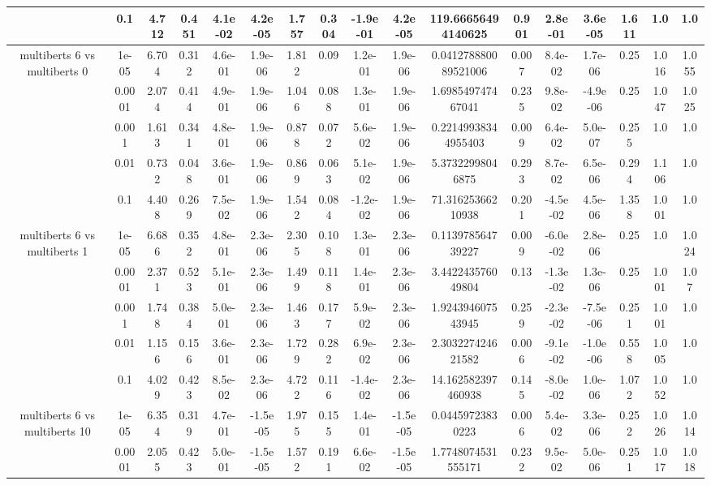 \begin{tabular}{|c|c|c|c|c|c|c|c|c|c|c|c|c|c|c|c|c|}
 & 0.1 & 4.712 & 0.451 & 4.1e-02 & 4.2e-05 & 1.757 & 0.304 & -1.9e-01 & 4.2e-05 & 119.66656494140625 & 0.901 & 2.8e-01 & 3.6e-05 & 1.611 & 1.0 & 1.0 \\
\hline
\multirow{5}{*}{multiberts 6 vs multiberts 0} & 1e-05 & 6.704 & 0.312 & 4.6e-01 & 1.9e-06 & 1.812 & 0.09 & 1.2e-01 & 1.9e-06 & 0.041278880089521006 & 0.007 & 8.4e-02 & 1.7e-06 & 0.25 & 1.016 & 1.055 \\
 & 0.0001 & 2.074 & 0.414 & 4.9e-01 & 1.9e-06 & 1.046 & 0.088 & 1.3e-01 & 1.9e-06 & 1.698549747467041 & 0.235 & 9.8e-02 & -4.9e-06 & 0.25 & 1.047 & 1.025 \\
 & 0.001 & 1.613 & 0.341 & 4.8e-01 & 1.9e-06 & 0.878 & 0.072 & 5.6e-02 & 1.9e-06 & 0.22149938344955403 & 0.009 & 6.4e-02 & 5.0e-07 & 0.255 & 1.0 & 1.0 \\
 & 0.01 & 0.732 & 0.048 & 3.6e-01 & 1.9e-06 & 0.869 & 0.063 & 5.1e-02 & 1.9e-06 & 5.37322998046875 & 0.293 & 8.7e-02 & 6.5e-06 & 0.294 & 1.106 & 1.0 \\
 & 0.1 & 4.408 & 0.269 & 7.5e-02 & 1.9e-06 & 1.542 & 0.084 & -1.2e-02 & 1.9e-06 & 71.31625366210938 & 0.201 & -4.5e-02 & 4.5e-06 & 1.358 & 1.001 & 1.0 \\
\hline
\multirow{5}{*}{multiberts 6 vs multiberts 1} & 1e-05 & 6.686 & 0.352 & 4.8e-01 & 2.3e-06 & 2.305 & 0.108 & 1.3e-01 & 2.3e-06 & 0.113978564739227 & 0.009 & -6.0e-02 & 2.8e-06 & 0.25 & 1.0 & 1.024 \\
 & 0.0001 & 2.371 & 0.523 & 5.1e-01 & 2.3e-06 & 1.499 & 0.118 & 1.4e-01 & 2.3e-06 & 3.442243576049804 & 0.13 & -1.3e-02 & 1.3e-06 & 0.25 & 1.001 & 1.07 \\
 & 0.001 & 1.748 & 0.384 & 5.0e-01 & 2.3e-06 & 1.463 & 0.177 & 5.9e-02 & 2.3e-06 & 1.924394607543945 & 0.259 & -2.3e-02 & -7.5e-06 & 0.251 & 1.001 & 1.0 \\
 & 0.01 & 1.156 & 0.156 & 3.6e-01 & 2.3e-06 & 1.729 & 0.282 & 6.9e-02 & 2.3e-06 & 2.303227424621582 & 0.006 & -9.1e-02 & -1.0e-06 & 0.558 & 1.005 & 1.0 \\
 & 0.1 & 4.029 & 0.423 & 8.5e-02 & 2.3e-06 & 4.722 & 0.116 & -1.4e-02 & 2.3e-06 & 14.162582397460938 & 0.145 & -8.0e-02 & 1.0e-06 & 1.072 & 1.052 & 1.0 \\
\hline
\multirow{5}{*}{multiberts 6 vs multiberts 10} & 1e-05 & 6.354 & 0.319 & 4.7e-01 & -1.5e-05 & 1.975 & 0.155 & 1.4e-01 & -1.5e-05 & 0.04459723830223 & 0.006 & 5.4e-02 & 3.3e-06 & 0.252 & 1.026 & 1.014 \\
 & 0.0001 & 2.055 & 0.423 & 5.0e-01 & -1.5e-05 & 1.572 & 0.191 & 6.6e-02 & -1.5e-05 & 1.7748074531555171 & 0.232 & 9.5e-02 & 5.0e-06 & 0.251 & 1.017 & 1.018 \\

\end{tabular}
